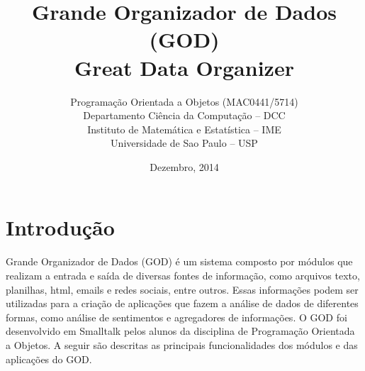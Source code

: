 \documentclass[12pt]{article}
\title{Grande Organizador de Dados (GOD) \\Great Data Organizer}
\author{
Programação Orientada a Objetos (MAC0441/5714)\\
Departamento Ciência da Computação -- DCC\\
Instituto de Matemática e Estatística -- IME\\
Universidade de Sao Paulo -- USP
}
\date{Dezembro, 2014}
\begin{document}
\maketitle
\newpage
\tableofcontents
\newpage

\section{Introdução}
Grande Organizador de Dados (GOD) é um sistema composto por módulos que realizam a entrada e saída de diversas fontes de informação, como arquivos texto, planilhas, html, emails e redes sociais, entre outros. 
Essas informações podem ser utilizadas para a criação de aplicações que fazem a análise de dados de diferentes formas, como análise de sentimentos e agregadores de informações.
O GOD foi desenvolvido em Smalltalk pelos alunos da disciplina de Programação Orientada a Objetos. A seguir são descritas as principais funcionalidades dos módulos e das aplicações do GOD.



\newpage
% 

\newpage

\newpage

\newpage

\newpage
% 

\newpage

\newpage

\newpage

\newpage

\newpage

\newpage

\newpage


\newpage

\newpage

\end{document}
